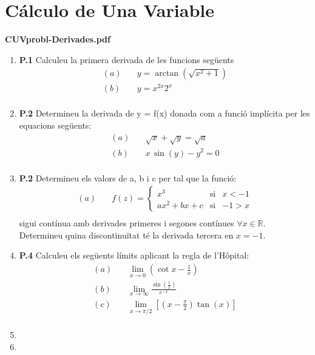 \documentclass[11pt]{article}
\begin{document}
\section*{Cálculo de Una Variable}

 \item \textbf{CUVprobl-Derivades.pdf}
    \begin{enumerate}
        \item \textbf{P.1} Calculeu la primera derivada de les funcions següents
            \begin{align*}
                (a) &\quad y = \arctan(\sqrt{x^2+1})   \\
                (b) &\quad y = x^{2x}2^x  \\
            \end{align*}

        \item \textbf{P.2} Determineu la derivada de y = f(x) donada com a funció implícita per les equacions següents:
            \begin{align*}
            (a) &\quad \sqrt{x} + \sqrt{y} = \sqrt{a}  \\
            (b) &\quad x \, \sin(y) - y^2 = 0  \\
            \end{align*}

        \item \textbf{P.2} Determineu els valors de a, b i c per tal que la funció:
            \begin{align*}
                (a) &\quad f(z) = \left\{ \begin{array}{rcl}
                            x^3 & \mbox{si} & x < -1 \\
                            ax^2 + bx + c & \mbox{si} & -1 > x
                                    \end{array}\right.  \\
            \end{align*}
        sigui contínua amb derivades primeres i segones contínues \(\forall x  \in \mathbb{R}\).
        Determineu quina discontinuïtat té la derivada tercera en \(x = -1\).

        \item \textbf{P.4} Calculeu els següents límits aplicant la regla de l'Hôpital:
            \begin{align*}
            (a) &\quad \lim_{{x \to 0}} \left(\cot{x -\frac{1}{x}}\right)  \\
            (b) &\quad \lim_{{x \to \infty}} \frac{\sin(\frac{1}{x})}{e^{-x}}  \\
            (c) &\quad \lim_{{x \to \pi/2}}   \left[ \left(x - \frac{\pi}{2} \right) \tan(x) \right]  \\
            \end{align*}




        \item

    \item \end{enumerate}






\nocite{cite_key}
\end{document}
